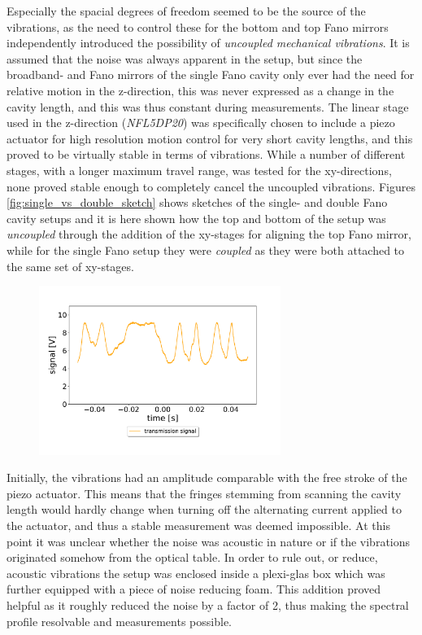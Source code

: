 Especially the spacial degrees of freedom seemed to be the source of the vibrations, as the need to control these for the bottom and top Fano mirrors independently introduced the possibility of \emph{uncoupled mechanical vibrations}. It is assumed that the noise was always apparent in the setup, but since the broadband- and Fano mirrors of the single Fano cavity only ever had the need for relative motion in the z-direction, this was never expressed as a change in the cavity length, and this was thus constant during measurements. The linear stage used in the z-direction (\emph{NFL5DP20}) was specifically chosen to include a piezo actuator for high resolution motion control for very short cavity lengths, and this proved to be virtually stable in terms of vibrations. While a number of different stages, with a longer maximum travel range, was tested for the xy-directions, none proved stable enough to completely cancel the uncoupled vibrations. Figures \ref{fig:single_vs_double_sketch} shows sketches of the single- and double Fano cavity setups and it is here shown how the top and bottom of the setup was \emph{uncoupled} through the addition of the xy-stages for aligning the top Fano mirror, while for the single Fano setup they were \emph{coupled} as they were both attached to the same set of xy-stages. 

\begin{figure}[h!]
    \centering
    \includegraphics[width=0.7\textwidth]{figures/results/noise_on_resonance.pdf}
    \caption{}
    \label{fig:noise_on_resonance}
\end{figure}

Initially, the vibrations had an amplitude comparable with the free stroke of the piezo actuator. This means that the fringes stemming from scanning the cavity length would hardly change when turning off the alternating current applied to the actuator, and thus a stable measurement was deemed impossible. At this point it was unclear whether the noise was acoustic in nature or if the vibrations originated somehow from the optical table. In order to rule out, or reduce, acoustic vibrations the setup was enclosed inside a plexi-glas box which was further equipped with a piece of noise reducing foam. This addition proved helpful as it roughly reduced the noise by a factor of 2, thus making the spectral profile resolvable and measurements possible. 

